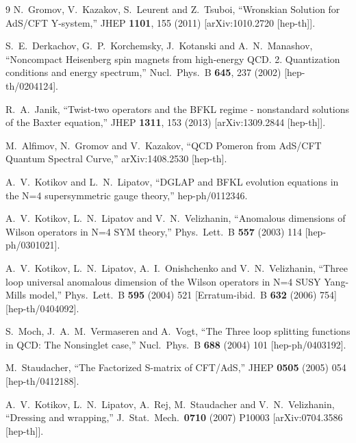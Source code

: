 \documentclass[a4paper,11pt]{article}
\numberwithin{equation}{section}
\begin{document}
\begin{thebibliography} {9}
  N.~Gromov, V.~Kazakov, S.~Leurent and Z.~Tsuboi,
  ``Wronskian Solution for AdS/CFT Y-system,''
  JHEP {\bf 1101}, 155 (2011)
  [arXiv:1010.2720 [hep-th]].

  S.~E.~Derkachov, G.~P.~Korchemsky, J.~Kotanski and A.~N.~Manashov,
  ``Noncompact Heisenberg spin magnets from high-energy QCD. 2. Quantization conditions and energy spectrum,''
  Nucl.\ Phys.\ B {\bf 645}, 237 (2002)
  [hep-th/0204124].

  R.~A.~Janik,
  ``Twist-two operators and the BFKL regime - nonstandard solutions of the Baxter equation,''
  JHEP {\bf 1311}, 153 (2013)
  [arXiv:1309.2844 [hep-th]].

  M.~Alfimov, N.~Gromov and V.~Kazakov,
  ``QCD Pomeron from AdS/CFT Quantum Spectral Curve,''
  arXiv:1408.2530 [hep-th].

  A.~V.~Kotikov and L.~N.~Lipatov,
  ``DGLAP and BFKL evolution equations in the N=4 supersymmetric gauge theory,''
  hep-ph/0112346.

  A.~V.~Kotikov, L.~N.~Lipatov and V.~N.~Velizhanin,
  ``Anomalous dimensions of Wilson operators in N=4 SYM theory,''
  Phys.\ Lett.\ B {\bf 557} (2003) 114
  [hep-ph/0301021].

  A.~V.~Kotikov, L.~N.~Lipatov, A.~I.~Onishchenko and V.~N.~Velizhanin,
  ``Three loop universal anomalous dimension of the Wilson operators in N=4 SUSY Yang-Mills model,''
  Phys.\ Lett.\ B {\bf 595} (2004) 521
   [Erratum-ibid.\ B {\bf 632} (2006) 754]
  [hep-th/0404092].

  S.~Moch, J.~A.~M.~Vermaseren and A.~Vogt,
  ``The Three loop splitting functions in QCD: The Nonsinglet case,''
  Nucl.\ Phys.\ B {\bf 688} (2004) 101
  [hep-ph/0403192].

  M.~Staudacher,
  ``The Factorized S-matrix of CFT/AdS,''
  JHEP {\bf 0505} (2005) 054
  [hep-th/0412188].

  A.~V.~Kotikov, L.~N.~Lipatov, A.~Rej, M.~Staudacher and V.~N.~Velizhanin,
  ``Dressing and wrapping,''
  J.\ Stat.\ Mech.\  {\bf 0710} (2007) P10003
  [arXiv:0704.3586 [hep-th]].


\end{thebibliography}
\end{document}
